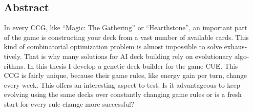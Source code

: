 

\begin{otherlanguage}{american}
	\chapter*{Abstract}
	In every CCG, like “Magic: The Gathering” or “Hearthstone”, an important part of the game is constructing your deck from a vast number
	of available cards. This kind of combinatorial optimization problem is almost impossible to solve exhaustively. That is why many
	solutions for AI deck building rely on evolutionary algorithms. In this thesis I develop a genetic deck builder for the game CUE. This
	CCG is fairly unique, because their game rules, like energy gain per turn, change every week. This offers an interesting aspect to test.
	Is it advantageous to keep evolving using the same decks over constantly changing game rules or is a fresh start for every rule change
	more successful?
\end{otherlanguage}
